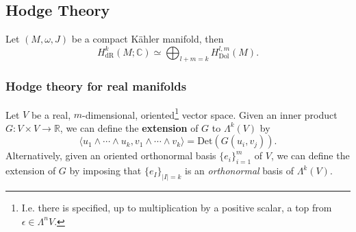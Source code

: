 \documentclass[11pt, final]{article}
\begin{document}
\subsection{Hodge Theory}

\begin{theorem}[Hodge]
	Let $(M,\omega,J)$ be a compact K\"ahler manifold, then
		\begin{equation}
			H^k_\mathrm{dR}(M;\mathbb{C}) \simeq \bigoplus_{l+m=k} H^{l,m}_\mathrm{Dol}(M).
		\end{equation}
\end{theorem}

\subsubsection{Hodge theory for real manifolds}

\begin{definition}
	Let $V$ be a real, $m$-dimensional, oriented\footnote{I.e. there is specified, up to multiplication by a positive scalar, a top from $\epsilon \in \Lambda^n V$.} vector space. Given an inner product $G: V \times V \to \mathbb{R}$, we can define the \textbf{extension} of $G$ to $\Lambda^k(V)$ by
		\begin{equation}
			\langle u_1 \wedge \cdots \wedge u_k, v_1 \wedge \cdots \wedge v_k \rangle = \mathrm{Det}\left(G(u_i,v_j)\right).
		\end{equation}
	Alternatively, given an oriented orthonormal basis $\{e_i\}_{i=1}^m$ of $V$, we can define the extension of $G$ by imposing that $\{e_I\}_{|I| = k}$ is an \textit{orthonormal} basis of $\Lambda^k(V)$.
\end{definition}
\end{document}
